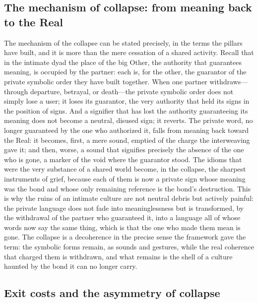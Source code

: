 \subsection*{The mechanism of collapse: from meaning back to the Real}

The mechanism of the collapse can be stated precisely, in the terms the pillars have built, and it is more than the mere cessation of a shared activity. Recall that in the intimate dyad the place of the big Other, the authority that guarantees meaning, is occupied by the partner: each is, for the other, the guarantor of the private symbolic order they have built together. When one partner withdraws---through departure, betrayal, or death---the private symbolic order does not simply lose a user; it loses its guarantor, the very authority that held its signs in the position of signs. And a signifier that has lost the authority guaranteeing its meaning does not become a neutral, disused sign; it reverts. The private word, no longer guaranteed by the one who authorized it, falls from meaning back toward the Real: it becomes, first, a mere sound, emptied of the charge the interweaving gave it; and then, worse, a sound that signifies precisely the absence of the one who is gone, a marker of the void where the guarantor stood. The idioms that were the very substance of a shared world become, in the collapse, the sharpest instruments of grief, because each of them is now a private sign whose meaning was the bond and whose only remaining reference is the bond's destruction. This is why the ruins of an intimate culture are not neutral debris but actively painful: the private language does not fade into meaninglessness but is transformed, by the withdrawal of the partner who guaranteed it, into a language all of whose words now say the same thing, which is that the one who made them mean is gone. The collapse is a decoherence in the precise sense the framework gave the term: the symbolic forms remain, as sounds and gestures, while the real coherence that charged them is withdrawn, and what remains is the shell of a culture haunted by the bond it can no longer carry.

\subsection*{Exit costs and the asymmetry of collapse}

